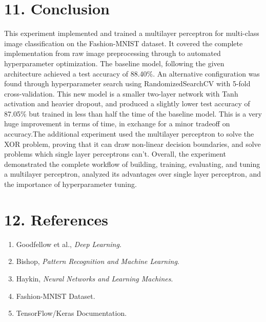 \documentclass[11pt]{article}
\begin{document}
\section*{11. Conclusion}

This experiment implemented and trained a multilayer perceptron for multi-class image classification on the Fashion-MNIST dataset. It covered the complete implementation from raw image preprocessing through to automated hyperparameter optimization. The baseline model, following the given architecture achieved a test accuracy of 88.40\%. An alternative configuration was found through hyperparameter search using RandomizedSearchCV with 5-fold cross-validation. This new model is a smaller two-layer network with Tanh activation and heavier dropout, and produced a slightly lower test accuracy of 87.05\% but trained in less than half the time of the baseline model. This is a very huge improvement in terms of time, in exchange for a minor tradeoff on accuracy.The additional experiment used the multilayer perceptron to solve the XOR problem, proving that it can draw non-linear decision boundaries, and solve problems which single layer perceptrons can't. Overall, the experiment demonstrated the complete workflow of building, training, evaluating, and tuning a multilayer perceptron, analyzed its advantages over single layer perceptron, and the importance of hyperparameter tuning.\\

\section*{12. References}
\begin{enumerate}
\item Goodfellow et al., \emph{Deep Learning}.
\item Bishop, \emph{Pattern Recognition and Machine Learning}.
\item Haykin, \emph{Neural Networks and Learning Machines}.
\item Fashion-MNIST Dataset.
\item TensorFlow/Keras Documentation.
\end{enumerate}
\end{document}

